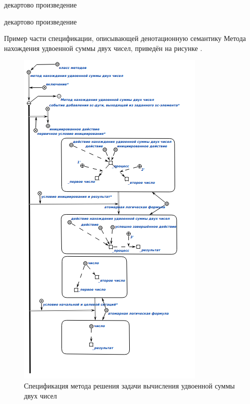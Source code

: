 \begin{SCn}
\begin{scnindent}
\end{scnindent}
\begin{scnindent}
    \begin{scnreltovector}{декартово произведение}
    \end{scnreltovector}
\end{scnindent}
\begin{scnindent}
    \begin{scnreltovector}{декартово произведение}
    \end{scnreltovector}
\end{scnindent}
\end{SCn}

Пример части спецификации, описывающей денотационную семантику Метода нахождения удвоенной суммы двух чисел, приведён на рисунке .

\begin{figure}[htbp]
  \center
  \includegraphics[scale=0.7]{author/part3/figures/condition_and_result.png}
  \caption{Спецификация метода решения задачи вычисления удвоенной суммы двух чисел}
  \label{fig:condition_and_result}
\end{figure}

